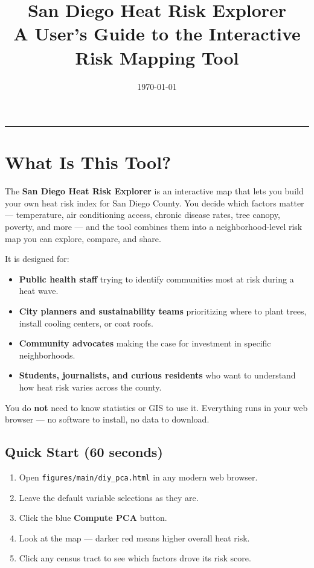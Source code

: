 \documentclass[11pt]{article}
\title{San Diego Heat Risk Explorer\\
       \large A User's Guide to the Interactive Risk Mapping Tool}
\author{}
\date{\today}
\begin{document}
\maketitle

\tableofcontents
\vspace{1em}
\hrule
\vspace{1em}

\section{What Is This Tool?}

The \textbf{San Diego Heat Risk Explorer} is an interactive map that lets you
build your own heat risk index for San Diego County. You decide which factors
matter --- temperature, air conditioning access, chronic disease rates, tree
canopy, poverty, and more --- and the tool combines them into a neighborhood-level
risk map you can explore, compare, and share.

It is designed for:
\begin{itemize}
  \item \textbf{Public health staff} trying to identify communities most at
        risk during a heat wave.
  \item \textbf{City planners and sustainability teams} prioritizing where to
        plant trees, install cooling centers, or coat roofs.
  \item \textbf{Community advocates} making the case for investment in
        specific neighborhoods.
  \item \textbf{Students, journalists, and curious residents} who want to
        understand how heat risk varies across the county.
\end{itemize}

You do \textbf{not} need to know statistics or GIS to use it. Everything runs
in your web browser --- no software to install, no data to download.

\subsection{Quick Start (60 seconds)}

\begin{enumerate}[leftmargin=*]
  \item Open \texttt{figures/main/diy\_pca.html} in any modern web browser.
  \item Leave the default variable selections as they are.
  \item Click the blue \textbf{Compute PCA} button.
  \item Look at the map --- darker red means higher overall heat risk.
  \item Click any census tract to see which factors drove its risk score.
\end{enumerate}
\end{document}
